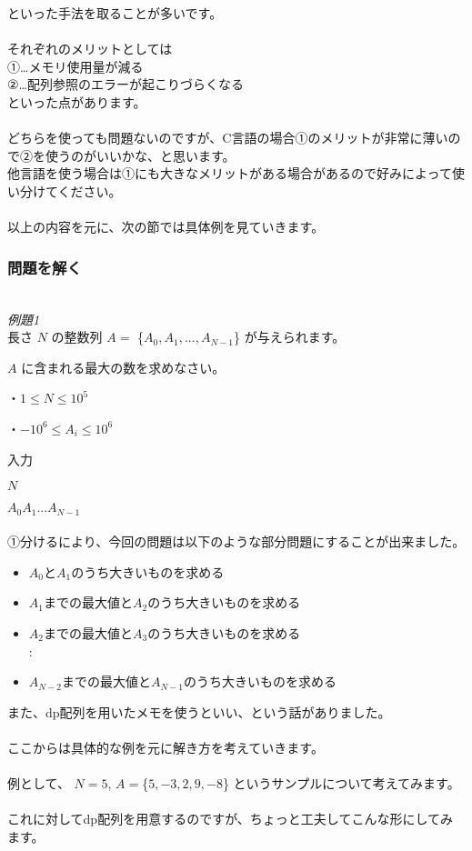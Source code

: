 といった手法を取ることが多いです。
\\ \\ \noindent
それぞれのメリットとしては\\
①…メモリ使用量が減る\\
②…配列参照のエラーが起こりづらくなる\\
といった点があります。
\\ \\ \noindent
どちらを使っても問題ないのですが、C言語の場合①のメリットが非常に薄いので②を使うのがいいかな、と思います。\\
他言語を使う場合は①にも大きなメリットがある場合があるので好みによって使い分けてください。
\\ \\ \noindent
以上の内容を元に、次の節では具体例を見ていきます。

\clearpage

\subsubsection{問題を解く}
\hrulefill \\
\emph{例題1} \\
長さ $N$ の整数列 $A=$ \{$A_0,A_1,...,A_{N-1}$\} が与えられます。

\noindent
$A$ に含まれる最大の数を求めなさい。

\noindent
・$1 \leq N \leq 10^5$

\noindent
・$-10^6 \leq A_i \leq 10^6$

\noindent
入力

\noindent
$N$

\noindent
$A_0 A_1 ... A_{N-1}$\\
\hrulefill \\

\noindent
①分けるにより、今回の問題は以下のような部分問題にすることが出来ました。

\begin{itemize}
    \item $A_0$と$A_1$のうち大きいものを求める
    \item $A_1$までの最大値と$A_2$のうち大きいものを求める
    \item $A_2$までの最大値と$A_3$のうち大きいものを求める \\:
    \item $A_{N-2}$までの最大値と$A_{N-1}$のうち大きいものを求める
\end{itemize}
\noindent
また、dp配列を用いたメモを使うといい、という話がありました。
\\ \\ \noindent
ここからは具体的な例を元に解き方を考えていきます。
\\ \\ \noindent
例として、
$N=5$, $A=$\{$5,-3,2,9,-8$\}
というサンプルについて考えてみます。
\\ \\ \noindent
これに対してdp配列を用意するのですが、ちょっと工夫してこんな形にしてみます。

